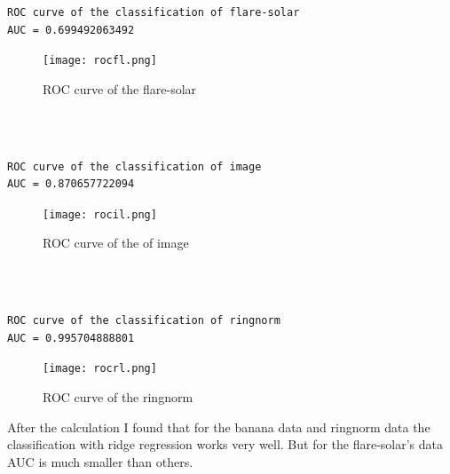 \documentclass[a4paper,11pt]{article}
\begin{document}
\begin{verbatim}
ROC curve of the classification of flare-solar 
AUC = 0.699492063492
\end{verbatim}

\begin{figure}[htbp]
 \centering 
  \texttt{[image: rocfl.png]}\\
  \caption{ROC curve of the flare-solar}
\end{figure}

\begin{verbatim}



\end{verbatim}

\begin{verbatim}
ROC curve of the classification of image 
AUC = 0.870657722094
\end{verbatim}

\begin{figure}[htbp]
 \centering 
  \texttt{[image: rocil.png]}\\
    \caption{ROC curve of the of image }
\end{figure}

\begin{verbatim}



\end{verbatim}


\begin{verbatim}
ROC curve of the classification of ringnorm
AUC = 0.995704888801
\end{verbatim}

\begin{figure}[htbp]
 \centering 
  \texttt{[image: rocrl.png]}\\
    \caption{ROC curve of the ringnorm }
\end{figure}

After the calculation I found that for the banana data and ringnorm data the classification with ridge regression works very well. But for the flare-solar's data AUC is much smaller than others.
\end{document}

